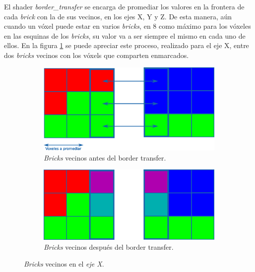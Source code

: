 El shader \textit{border\_transfer} se encarga de promediar los valores en la frontera de cada \textit{brick} con la de sus vecinos, en los ejes X, Y y Z.
De esta manera, aún cuando un vóxel puede estar en varios \textit{bricks}, en $8$ como máximo para los vóxeles en las esquinas de los \textit{bricks}, su valor va a ser siempre el mismo en cada uno de ellos. %
En la figura \ref{fig:border_transfer} se puede apreciar este proceso, realizado para el eje X, entre dos \textit{bricks} vecinos con los vóxels que comparten enmarcados.

\begin{figure}[h!]
    \centering
    \begin{subfigure}{1.0\textwidth}
        \centering
        \includegraphics[width=1.0\textwidth]{border-transfer.png}
        \caption{\textit{Bricks} vecinos antes del border transfer.}
    \end{subfigure}
    \begin{subfigure}{1.0\textwidth}
        \centering
        \includegraphics[width=1.0\textwidth]{border-transfer-b.png}
        \caption{\textit{Bricks} vecinos después del border transfer.}
    \end{subfigure}
    \caption{\textit{Bricks} vecinos en el \textit{eje X}.}
    \label{fig:border_transfer}
\end{figure}

